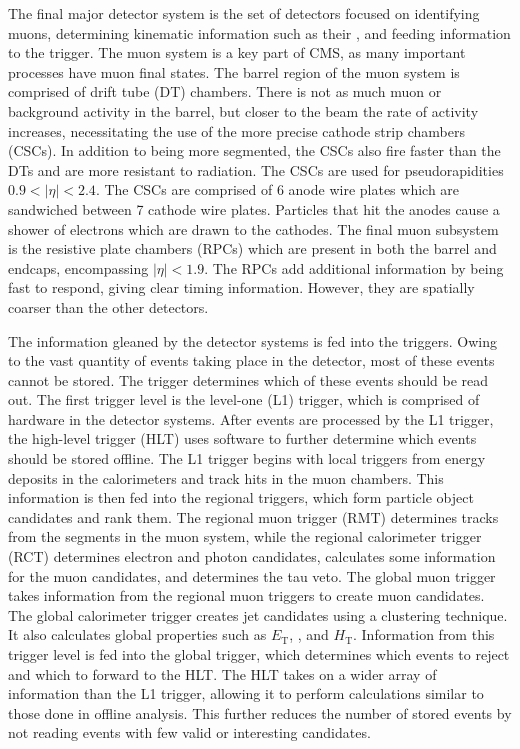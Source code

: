 The final major detector system is the set of detectors focused on identifying muons, determining kinematic information such as their \pt, and feeding information to the trigger. The muon system is a key part of CMS, as many important processes have muon final states. The barrel region of the muon system is comprised of drift tube (DT) chambers. There is not as much muon or background activity in the barrel, but closer to the beam the rate of activity increases, necessitating the use of the more precise cathode strip chambers (CSCs). In addition to being more segmented, the CSCs also fire faster than the DTs and are more resistant to radiation. The CSCs are used for pseudorapidities $0.9 < |\eta| < 2.4$. The CSCs are comprised of 6 anode wire plates which are sandwiched between 7 cathode wire plates. Particles that hit the anodes cause a shower of electrons which are drawn to the cathodes. The final muon subsystem is the resistive plate chambers (RPCs) which are present in both the barrel and endcaps, encompassing $|\eta| < 1.9$. The RPCs add additional information by being fast to respond, giving clear timing information. However, they are spatially coarser than the other detectors.

The information gleaned by the detector systems is fed into the triggers. Owing to the vast quantity of events taking place in the detector, most of these events cannot be stored. The trigger determines which of these events should be read out. The first trigger level is the level-one (L1) trigger, which is comprised of hardware in the detector systems. After events are processed by the L1 trigger, the high-level trigger (HLT) uses software to further determine which events should be stored offline. 
The L1 trigger begins with local triggers from energy deposits in the calorimeters and track hits in the muon chambers. This information is then fed into the regional triggers, which form particle object candidates and rank them. The regional muon trigger (RMT) determines tracks from the segments in the muon system, while the regional calorimeter trigger (RCT) determines electron and photon candidates, calculates some information for the muon candidates, and determines the tau veto. The global muon trigger takes information from the regional muon triggers to create muon candidates. The global calorimeter trigger creates jet candidates using a clustering technique. It also calculates global properties such as $E_\mathrm{T}$, \ptmiss, and $H_\mathrm{T}$. Information from this trigger level is fed into the global trigger, which determines which events to reject and which to forward to the HLT. 
The HLT takes on a wider array of information than the L1 trigger, allowing it to perform calculations similar to those done in offline analysis. This further reduces the number of stored events by not reading events with few valid or interesting candidates.

